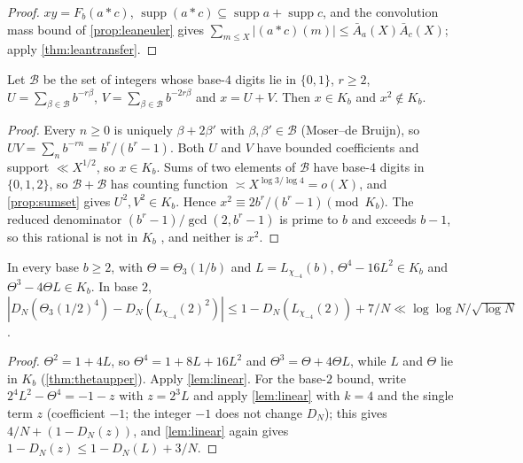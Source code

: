 \documentclass[11pt]{article}
\DeclareMathOperator{\supp}{supp}
\newcommand{\LL}{\log\log N}
\begin{document}
\begin{proof}
$xy=F_b(a*c)$, $\supp(a*c)\subseteq\supp a+\supp c$, and the convolution mass bound of
\cref{prop:leaneuler} gives $\sum_{m\le X}|(a*c)(m)|\le\bar A_a(X)\bar A_c(X)$; apply
\cref{thm:leantransfer}.
\end{proof}

\begin{proposition}\label{prop:squaring}
Let $\mathcal B$ be the set of integers whose base-$4$ digits lie in $\{0,1\}$, $r\ge2$,
$U=\sum_{\beta\in\mathcal B}b^{-r\beta}$, $V=\sum_{\beta\in\mathcal B}b^{-2r\beta}$ and $x=U+V$. Then
$x\in K_b$ and $x^2\notin K_b$.
\end{proposition}

\begin{proof}
Every $n\ge0$ is uniquely $\beta+2\beta'$ with $\beta,\beta'\in\mathcal B$ (Moser--de Bruijn), so
$UV=\sum_nb^{-rn}=b^r/(b^r-1)$. Both $U$ and $V$ have bounded coefficients and support
$\ll X^{1/2}$, so $x\in K_b$. Sums of two elements of $\mathcal B$ have base-$4$ digits in
$\{0,1,2\}$, so $\mathcal B+\mathcal B$ has counting function $\asymp X^{\log3/\log4}=o(X)$, and
\cref{prop:sumset} gives $U^2,V^2\in K_b$. Hence $x^2\equiv2b^r/(b^r-1)\pmod{K_b}$. The reduced
denominator $(b^r-1)/\gcd(2,b^r-1)$ is prime to $b$ and exceeds $b-1$, so this rational is not in
$K_b$ \cite{DiscrepancyCompanion}, and neither is $x^2$.
\end{proof}

\begin{proposition}\label{prop:thetapowers}
In every base $b\ge2$, with $\Theta=\Theta_3(1/b)$ and $L=L_{\chi_{-4}}(b)$,
$\Theta^4-16L^2\in K_b$ and $\Theta^3-4\Theta L\in K_b$. In base $2$,
$|D_N(\Theta_3(1/2)^4)-D_N(L_{\chi_{-4}}(2)^2)|\le1-D_N(L_{\chi_{-4}}(2))+7/N\ll\LL/\sqrt{\log N}$.
\end{proposition}

\begin{proof}
$\Theta^2=1+4L$, so $\Theta^4=1+8L+16L^2$ and $\Theta^3=\Theta+4\Theta L$, while $L$ and $\Theta$ lie in
$K_b$ (\cref{thm:thetaupper}). Apply \cref{lem:linear}. For the base-$2$ bound, write
$2^4L^2-\Theta^4=-1-z$ with $z=2^3L$ and apply \cref{lem:linear} with $k=4$ and the single term
$z$ (coefficient $-1$; the integer $-1$ does not change $D_N$); this gives $4/N+(1-D_N(z))$, and
\cref{lem:linear} again gives $1-D_N(z)\le1-D_N(L)+3/N$.
\end{proof}
\end{document}
